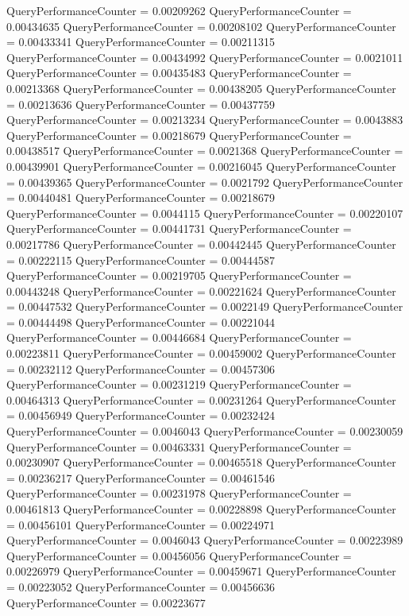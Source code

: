 \documentclass[9pt]{article}
\theoremstyle{plain}
\theoremstyle{definition}
\theoremstyle{remark}
\numberwithin{equation}{section}
\begin{document}
QueryPerformanceCounter  =  0.00209262
QueryPerformanceCounter  =  0.00434635
QueryPerformanceCounter  =  0.00208102
QueryPerformanceCounter  =  0.00433341
QueryPerformanceCounter  =  0.00211315
QueryPerformanceCounter  =  0.00434992
QueryPerformanceCounter  =  0.0021011
QueryPerformanceCounter  =  0.00435483
QueryPerformanceCounter  =  0.00213368
QueryPerformanceCounter  =  0.00438205
QueryPerformanceCounter  =  0.00213636
QueryPerformanceCounter  =  0.00437759
QueryPerformanceCounter  =  0.00213234
QueryPerformanceCounter  =  0.0043883
QueryPerformanceCounter  =  0.00218679
QueryPerformanceCounter  =  0.00438517
QueryPerformanceCounter  =  0.0021368
QueryPerformanceCounter  =  0.00439901
QueryPerformanceCounter  =  0.00216045
QueryPerformanceCounter  =  0.00439365
QueryPerformanceCounter  =  0.0021792
QueryPerformanceCounter  =  0.00440481
QueryPerformanceCounter  =  0.00218679
QueryPerformanceCounter  =  0.0044115
QueryPerformanceCounter  =  0.00220107
QueryPerformanceCounter  =  0.00441731
QueryPerformanceCounter  =  0.00217786
QueryPerformanceCounter  =  0.00442445
QueryPerformanceCounter  =  0.00222115
QueryPerformanceCounter  =  0.00444587
QueryPerformanceCounter  =  0.00219705
QueryPerformanceCounter  =  0.00443248
QueryPerformanceCounter  =  0.00221624
QueryPerformanceCounter  =  0.00447532
QueryPerformanceCounter  =  0.0022149
QueryPerformanceCounter  =  0.00444498
QueryPerformanceCounter  =  0.00221044
QueryPerformanceCounter  =  0.00446684
QueryPerformanceCounter  =  0.00223811
QueryPerformanceCounter  =  0.00459002
QueryPerformanceCounter  =  0.00232112
QueryPerformanceCounter  =  0.00457306
QueryPerformanceCounter  =  0.00231219
QueryPerformanceCounter  =  0.00464313
QueryPerformanceCounter  =  0.00231264
QueryPerformanceCounter  =  0.00456949
QueryPerformanceCounter  =  0.00232424
QueryPerformanceCounter  =  0.0046043
QueryPerformanceCounter  =  0.00230059
QueryPerformanceCounter  =  0.00463331
QueryPerformanceCounter  =  0.00230907
QueryPerformanceCounter  =  0.00465518
QueryPerformanceCounter  =  0.00236217
QueryPerformanceCounter  =  0.00461546
QueryPerformanceCounter  =  0.00231978
QueryPerformanceCounter  =  0.00461813
QueryPerformanceCounter  =  0.00228898
QueryPerformanceCounter  =  0.00456101
QueryPerformanceCounter  =  0.00224971
QueryPerformanceCounter  =  0.0046043
QueryPerformanceCounter  =  0.00223989
QueryPerformanceCounter  =  0.00456056
QueryPerformanceCounter  =  0.00226979
QueryPerformanceCounter  =  0.00459671
QueryPerformanceCounter  =  0.00223052
QueryPerformanceCounter  =  0.00456636
QueryPerformanceCounter  =  0.00223677
\end{document}
